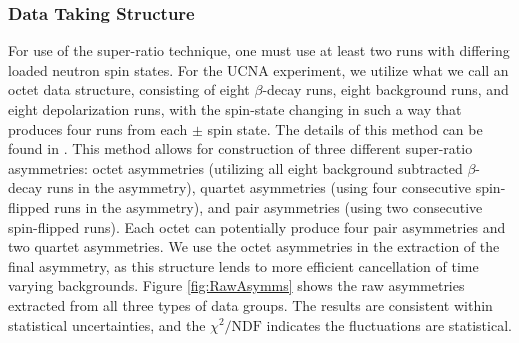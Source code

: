 \subsubsection{Data Taking Structure}

For use of the super-ratio technique, one must use at least two runs with differing loaded
neutron spin states. For the UCNA experiment, we utilize what we call an octet data structure,
consisting of eight $\beta$-decay runs, eight background runs, and eight depolarization
runs, with the spin-state changing in such a way that produces
four runs from each $\pm$ spin state.
The details of this method can be found in \cite{plaster2012}. This method allows for
construction of three different super-ratio asymmetries: octet asymmetries (utilizing all eight background subtracted
$\beta$-decay runs in the asymmetry), quartet asymmetries (using four consecutive spin-flipped
runs in the asymmetry), and pair asymmetries (using two consecutive spin-flipped runs). Each octet can potentially
produce four pair asymmetries and two quartet asymmetries. We use
the octet asymmetries in the extraction of the final asymmetry, as this structure lends to more
efficient cancellation of time varying backgrounds. Figure \ref{fig:RawAsymms} shows the
raw asymmetries extracted from all three types of data groups. The results are consistent
within statistical uncertainties, and the $\chi^2/\textrm{NDF}$ indicates the fluctuations
are statistical. 

